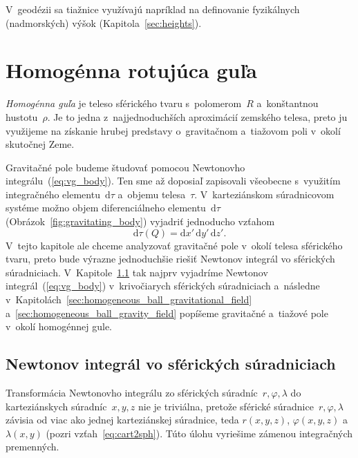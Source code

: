 \documentclass[a4paper, 12pt]{book}
\newcommand{\diff}{\mathrm d}
\begin{document}
V~geodézii sa tiažnice využívajú napríklad na definovanie fyzikálnych 
(nadmorských) výšok (Kapitola~\ref{sec:heights}).

\section{Homogénna rotujúca guľa}
\label{sec:homogeneous_ball}

\emph{Homogénna guľa} je teleso sférického tvaru s~polomerom~$R$ a~konštantnou 
hustotu~$\rho$.  Je to jedna z~najjednoduchších aproximácií zemského telesa, 
preto ju využijeme na získanie hrubej predstavy o~gravitačnom a~tiažovom poli 
v~okolí skutočnej Zeme.

Gravitačné pole budeme študovať pomocou Newtonovho 
integrálu~(\ref{eq:vg_body}).  Ten sme až doposiaľ zapisovali všeobecne 
s~využitím integračného elementu~$\diff \tau$ a~objemu telesa~$\tau$.  
V~karteziánskom súradnicovom systéme možno objem diferenciálneho 
elementu~$\diff \tau$ (Obrázok~\ref{fig:gravitating_body}) vyjadriť jednoducho 
vzťahom
%
\begin{equation}
\label{eq:dtau_cart}
\diff \tau(Q) = \diff x' \, \diff y' \, \diff z'{.}
\end{equation}
% 
V~tejto kapitole ale chceme analyzovať gravitačné pole v~okolí telesa 
sférického tvaru, preto bude výrazne jednoduchšie riešiť Newtonov integrál vo 
sférických súradniciach.  
V~Kapitole~\ref{sec:newton_integral_in_spherical_coordinates} tak najprv 
vyjadríme Newtonov integrál~(\ref{eq:vg_body}) v~krivočiarych sférických 
súradniciach a~následne 
v~Kapitolách~\ref{sec:homogeneous_ball_gravitational_field} 
a~\ref{sec:homogeneous_ball_gravity_field} popíšeme gravitačné a~tiažové pole 
v~okolí homogénnej gule.

\subsection{Newtonov integrál vo sférických súradniciach}
\label{sec:newton_integral_in_spherical_coordinates}

Transformácia Newtonovho integrálu zo sférických súradníc~$r, \varphi, \lambda$ 
do karteziánskych súradníc~$x, y, z$ nie je triviálna, pretože sférické 
súradnice~$r, \varphi, \lambda$ závisia od viac ako jednej karteziánskej 
súradnice, teda $r(x, y, z)$, $\varphi(x, y, z)$ a~$\lambda(x, y)$ (pozri 
vzťah~\ref{eq:cart2sph}).  Túto úlohu vyriešime zámenou integračných 
premenných.
\end{document}

